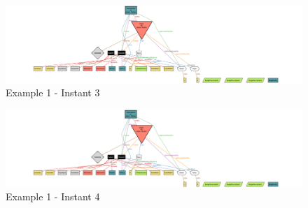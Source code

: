 \begin{figure}[H]
    \centering
    \includegraphics[angle=90,origin=c, height=0.91\textwidth]{alloy/images/example1_3.png}
    \caption{Example 1 - Instant 3}
\end{figure}

\begin{figure}[H]
    \centering
    \includegraphics[angle=90,origin=c, height=0.91\textwidth]{alloy/images/example1_4.png}
    \caption{Example 1 - Instant 4}
\end{figure}


